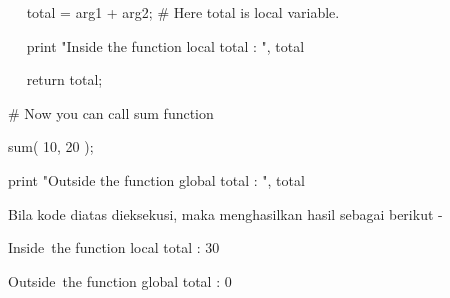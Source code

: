 \noindent 
 \hspace*{0.5in} ~~ total = arg1 + arg2;  $  \#  $ Here total is local variable. \par
\noindent 
 \hspace*{0.5in} ~~ print "Inside the function local total : ", total \par
\noindent 
 \hspace*{0.5in} ~~ return total; \par
\noindent 
 \hspace*{0.5in} \vspace{12pt}
\noindent 
 \hspace*{0.5in}  $  \#  $ Now you can call sum function \par
\noindent 
 \hspace*{0.5in} sum( 10, 20 ); \par
\noindent 
 \hspace*{0.5in} print "Outside the function global total : ", total  \par
\noindent 
Bila kode diatas dieksekusi, maka menghasilkan hasil sebagai berikut - \par
\noindent 
 \hspace*{0.5in} Inside~the function local total :  30 \par
\noindent 
 \hspace*{0.5in} Outside~the function global total :  0 \par

